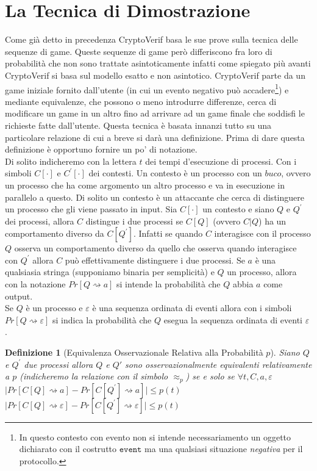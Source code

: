 \documentclass[a4paper,openright,twoside,12pt]{report}
\newtheorem{definizione}{Definizione}[chapter]
\begin{document}
\section{La Tecnica di Dimostrazione}
Come gi\`a detto in precedenza CryptoVerif basa le sue prove sulla tecnica delle sequenze di game. Queste sequenze di game per\`o differiscono fra loro
di probabilit\`a che non sono trattate asintoticamente infatti come spiegato pi\`u avanti CryptoVerif si basa sul modello esatto e non asintotico.
CryptoVerif parte da un game iniziale fornito dall'utente 
(in cui un evento negativo pu\`o accadere\footnote{In questo contesto con evento non si intende necessariamento un oggetto 
dichiarato con il costrutto $\texttt{event}$ ma una qualsiasi situazione \emph{negativa} per il protocollo.}) e mediante equivalenze, 
che possono o meno
introdurre differenze, cerca di modificare un game in un altro fino ad arrivare ad un game finale che soddisfi le richieste fatte dall'utente. Questa tecnica \`e basata innanzi tutto su una 
particolare relazione di cui a breve si dar\`a una definizione. Prima di dare questa definizione \`e opportuno fornire un po' di notazione. \\Di solito indicheremo con la lettera $t$ dei tempi d'esecuzione di processi. Con i simboli $C[\cdot]$ e $C^{'}[\cdot]$ dei contesti.
Un contesto \`e un processo con un $buco$, ovvero un processo che ha come argomento un altro processo e va in esecuzione in parallelo a questo. Di solito un contesto \`e un attaccante che cerca di distinguere un processo che 
gli viene passato in input. Sia $C[\cdot]$ un contesto e siano $Q$ e $Q^{'}$ dei processi, allora $C$ distingue i due processi se $C[Q]$ (ovvero $C|Q$) ha un comportamento diverso da $C[Q^{'}]$.
Infatti se quando $C$ interagisce con il processo $Q$ osserva un comportamento diverso da quello che osserva quando interagisce con $Q^{'}$ allora $C$ pu\`o effettivamente distinguere i due processi.
Se $a$ \`e una qualsiasia stringa (supponiamo binaria per semplicit\`a) e $Q$ un processo, allora con la notazione $Pr[Q \rightsquigarrow a]$ si intende la probabilit\`a
che $Q$ abbia $a$ come output. \\
Se $Q$ \`e un processo e $\varepsilon$ \`e una sequenza ordinata di eventi allora con i simboli $Pr[Q \rightsquigarrow \varepsilon]$ si indica la probabilit\`a che $Q$ esegua la sequenza ordinata di eventi $\varepsilon$ . 
\begin{definizione}[Equivalenza Osservazionale Relativa alla Probabilit\`a $p$]
Siano $Q$ e $Q^{'}$ due processi allora $Q$ e $Q{'}$ sono osservazionalmente equivalenti relativamente a $p$ (indicheremo la relazione con il simbolo $\approx_p$) se e solo se $\forall t, C, a, \varepsilon$
$\lvert Pr[C[Q] \rightsquigarrow a] - Pr[C[Q^{'}]\rightsquigarrow a] \rvert \leq p(t)$ $\lvert Pr[C[Q] \rightsquigarrow \varepsilon] -  Pr[C[Q^{'}] \rightsquigarrow \varepsilon]\rvert \leq p(t)$ 
\end{definizione}
\end{document}
